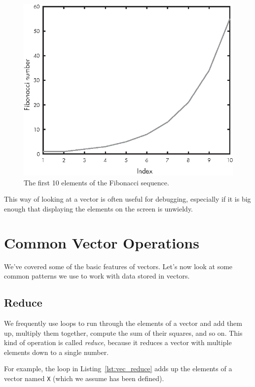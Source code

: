 \begin{figure}[H]
\includegraphics{book/images/figure04_01_new_v1.eps}
\caption{The first 10 elements of the Fibonacci sequence.}
\label{fig:fibonacci}
\end{figure}

This way of looking at a vector is often useful for debugging, especially
if it is big enough that displaying the elements on
the screen is unwieldy.


\section{Common Vector Operations}

We've covered some of the basic features of vectors. Let's now look at some common patterns we use to work with data stored in vectors.

\subsection{Reduce}
\label{reduce}

We frequently use loops to run through the elements of a vector
and add them up, multiply them together, compute the sum
of their squares, and so on.  This kind of operation is called \emph{reduce},
because it reduces a vector with multiple elements down to a single
number.


For example, the loop in Listing~\ref{lst:vec_reduce} adds up the elements of a vector named \lstinline{X} (which we assume has been defined).

